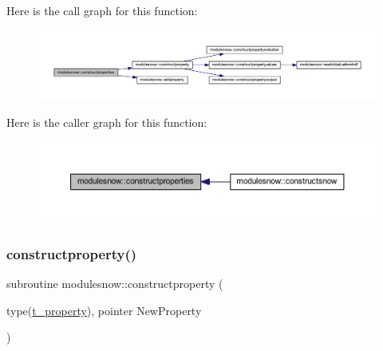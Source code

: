 Here is the call graph for this function\+:\nopagebreak
\begin{figure}[H]
\begin{center}
\leavevmode
\includegraphics[width=350pt]{namespacemodulesnow_a5906c8b8cc45f1a2cbb5a702d0d4aecc_cgraph}
\end{center}
\end{figure}
Here is the caller graph for this function\+:\nopagebreak
\begin{figure}[H]
\begin{center}
\leavevmode
\includegraphics[width=350pt]{namespacemodulesnow_a5906c8b8cc45f1a2cbb5a702d0d4aecc_icgraph}
\end{center}
\end{figure}
\mbox{\label{namespacemodulesnow_a1ebff32e94c1fd5415eb41bb77f7b10a}} 
\subsubsection{\texorpdfstring{constructproperty()}{constructproperty()}}
{\footnotesize\ttfamily subroutine modulesnow\+::constructproperty (\begin{DoxyParamCaption}\item[{type(\mbox{\hyperlink{structmodulesnow_1_1t__property}{t\+\_\+property}}), pointer}]{New\+Property }\end{DoxyParamCaption})\hspace{0.3cm}{\ttfamily [private]}}

